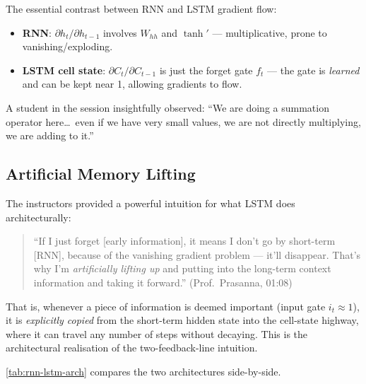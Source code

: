 \documentclass[12pt,a4paper]{article}
\begin{document}
\begin{keyinsight}[title=Additive vs Multiplicative Updates]
  The essential contrast between RNN and LSTM gradient flow:
  \begin{itemize}[nosep]
    \item \textbf{RNN}: $\partial h_t / \partial h_{t-1}$
          involves $W_{hh}$ and $\tanh'$ --- multiplicative, prone to
          vanishing/exploding.
    \item \textbf{LSTM cell state}: $\partial C_t / \partial C_{t-1}$
          is just the forget gate $f_t$ --- the gate is \emph{learned}
          and can be kept near 1, allowing gradients to flow.
  \end{itemize}
  A student in the session insightfully observed: ``We are doing a
  summation operator here\ldots\ even if we have very small values, we are
  not directly multiplying, we are adding to it.''
\end{keyinsight}

\subsection{Artificial Memory Lifting}
\label{subsec:artificial-memory}

The instructors provided a powerful intuition for what LSTM does
architecturally:

\begin{quote}
``If I just forget [early information], it means I don't go by short-term
[RNN], because of the vanishing gradient problem --- it'll disappear. That's
why I'm \emph{artificially lifting up} and putting into the long-term context
information and taking it forward.'' \hfill (Prof.\ Prasanna, 01:08)
\end{quote}

That is, whenever a piece of information is deemed important
(input gate $i_t \approx 1$), it is \emph{explicitly copied} from the
short-term hidden state into the cell-state highway, where it can travel
any number of steps without decaying. This is the architectural realisation
of the two-feedback-line intuition.

\cref{tab:rnn-lstm-arch} compares the two architectures side-by-side.
\end{document}
